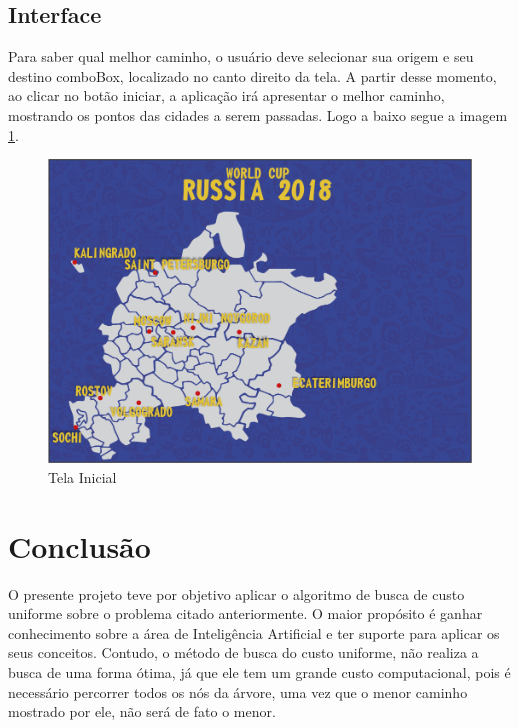 \documentclass[12pt]{article}
\begin{document}
\subsection{Interface}
Para saber qual melhor caminho, o usuário deve selecionar sua origem e seu destino comboBox, localizado no canto direito da tela. A partir desse momento, ao clicar no botão iniciar, a aplicação irá apresentar o melhor caminho, mostrando os pontos das cidades a serem passadas. Logo a baixo segue a imagem \ref{fig:fig2}.
\begin{figure}[H]
	\centering
	\includegraphics[width=0.9\columnwidth]{imagem/TELAESBOCO}
	\caption{Tela Inicial}
	\label{fig:fig2}
\end{figure}

\section{Conclusão}
O presente projeto teve por objetivo aplicar o algoritmo de busca de custo uniforme sobre o problema citado anteriormente. O maior propósito é ganhar conhecimento sobre a área de Inteligência Artificial e ter suporte para aplicar os seus conceitos. Contudo, o método de busca do custo uniforme, não realiza a busca de uma forma ótima, já que ele tem um grande custo computacional, pois é necessário percorrer todos os nós da árvore, uma vez que o menor caminho mostrado por ele, não será de fato o menor.
\end{document}
